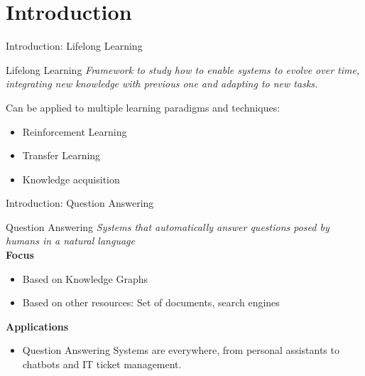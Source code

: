 \documentclass{beamer}
\begin{document}
\section{Introduction}
\begin{frame}{Introduction: Lifelong Learning}
  \begin{block}{Lifelong Learning}
    \vspace{0.2cm}
    \textit{Framework to study how to enable systems to evolve over time, integrating new knowledge with previous one and adapting to new tasks.} \par

    Can be applied to multiple learning paradigms and techniques:
    \begin{itemize}
      \item Reinforcement Learning
      \item Transfer Learning
      \item Knowledge acquisition
    \end{itemize}
  \end{block}
\end{frame}

\begin{frame}{Introduction: Question Answering}
  \begin{block}{Question Answering}
    \vspace{0.2cm}
    \textit{Systems that automatically answer questions posed by humans in a natural language} \\
    \vspace{0.2cm}
    \alert{\textbf{Focus}}
    \begin{itemize}
      \item Based on Knowledge Graphs
      \item Based on other resources: Set of documents, search engines
    \end{itemize}
    \alert{\textbf{Applications}}
    \begin{itemize}
      \item Question Answering Systems are everywhere, from personal assistants to chatbots and IT ticket management.
    \end{itemize}
  \end{block}
\end{frame}

\end{document}
